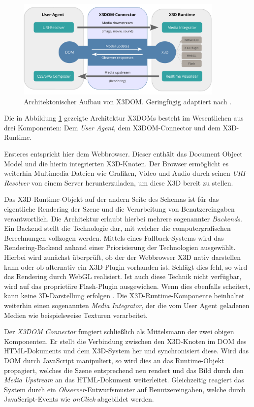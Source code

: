 \begin{figure}
	\centering
	\includegraphics[width=0.9\textwidth]{kap4/x3d/figures/x3dom_architecture-crop.pdf}
	\caption{Architektonischer Aufbau von X3DOM. Geringfügig adaptiert nach \textcite{Behr:2010:SAH:1836049.1836077}.}
	\label{FIG:X3DOM_ARCHITECTURE}
\end{figure}

Die in Abbildung \ref{FIG:X3DOM_ARCHITECTURE} gezeigte Architektur X3DOMs besteht im Wesentlichen aus drei Komponenten: Dem \emph{User Agent}, dem X3DOM-Connector und dem X3D-Runtime.

Ersteres entspricht hier dem Webbrowser. Dieser enthält das Document Object Model und die hierin integrierten X3D-Knoten. Der Browser ermöglicht es weiterhin Multimedia-Dateien wie Grafiken, Video und Audio durch seinen \emph{URI-Resolver} von einem Server herunterzuladen, um diese X3D bereit zu stellen.

Das X3D-Runtime-Objekt auf der andern Seite des Schemas ist für das eigentliche Rendering der Szene und die Verarbeitung von Benutzereingaben verantwortlich. Die Architektur erlaubt hierbei mehrere sogenannter \emph{Backends}. Ein Backend stellt die Technologie dar, mit welcher die computergrafischen Berechnungen vollzogen werden. Mittels eines Fallback-Systems wird das Rendering-Backend anhand einer Priorisierung der Technologien ausgewählt. Hierbei wird zunächst überprüft, ob der der Webbrowser X3D nativ darstellen kann oder ob alternativ ein X3D-Plugin vorhanden ist. Schlägt dies fehl, so wird das Rendering durch WebGL realisiert. Ist auch diese Technik nicht verfügbar, wird auf das proprietäre Flash-Plugin ausgewichen. Wenn dies ebenfalls scheitert, kann keine 3D-Darstellung erfolgen \autocite{Behr:2010:SAH:1836049.1836077}. Die X3D-Runtime-Komponente beinhaltet weiterhin einen sogenannten \emph{Media Integrator}, der die vom User Agent geladenen Medien wie beispielsweise Texturen verarbeitet.

Der \emph{X3DOM Connector} fungiert schließlich als Mittelsmann der zwei obigen Komponenten. Er stellt die Verbindung zwischen den X3D-Knoten im DOM des HTML-Dokuments und dem X3D-System her und synchronisiert diese. Wird das DOM durch JavaScript manipuliert, so wird dies an das Runtime-Objekt propagiert, welches die Szene entsprechend neu rendert und das Bild durch den \emph{Media Upstream} an das HTML-Dokument weiterleitet. Gleichzeitig reagiert das System durch ein \emph{Observer}-Entwurfsmuster auf Benutzereingaben, welche durch JavaScript-Events wie \emph{onClick} abgebildet werden.

